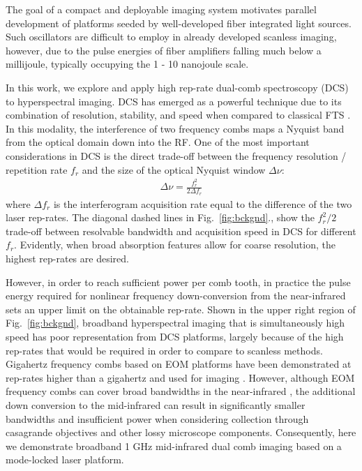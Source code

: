 \documentclass{optica-article}
\begin{document}
The goal of a compact and deployable imaging system motivates parallel development of platforms seeded by well-developed fiber integrated light sources. Such oscillators are difficult to employ in already developed scanless imaging, however, due to the pulse energies of fiber amplifiers falling much below a millijoule, typically occupying the 1 - 10 nanojoule scale. 

In this work, we explore and apply high rep-rate dual-comb spectroscopy (DCS) to hyperspectral imaging. DCS has emerged as a powerful technique due to its combination of resolution, stability, and speed when compared to classical FTS \cite{coddingtonDualcombSpectroscopy2016}. In this modality, the interference of two frequency combs maps a Nyquist band from the optical domain down into the RF. One of the most important considerations in DCS is the direct trade-off between the frequency resolution / repetition rate $f_r$ and the size of the optical Nyquist window $\Delta \nu$:
% 
\begin{align}
    \Delta \nu = \frac{f_r^2}{2 \Delta f_r}
    \label{eq:dcs}
\end{align}
% 
where $\Delta f_r$ is the interferogram acquisition rate equal to the difference of the two laser rep-rates. The diagonal dashed lines in \mbox{Fig. \ref{fig:bckgnd}}., show the $f_r^2/2$ trade-off between resolvable bandwidth and acquisition speed in DCS for different $f_r$. Evidently, when broad absorption features allow for coarse resolution, the highest rep-rates are desired. 

However, in order to reach sufficient power per comb tooth, in practice the pulse energy required for nonlinear frequency down-conversion from the near-infrared sets an upper limit on the obtainable rep-rate. Shown in the upper right region of \mbox{Fig. \ref{fig:bckgnd}}, broadband hyperspectral imaging that is simultaneously high speed has poor representation from DCS platforms, largely because of the high rep-rates that would be required in order to compare to scanless methods. Gigahertz frequency combs based on EOM platforms have been demonstrated at rep-rates higher than a gigahertz \cite{kowligyMidinfraredFrequencyCombs2020} and used for imaging \cite{ullahkhanDirectHyperspectralDualcomb2020,khanSubGHzOpticalResolution2023}. However, although EOM frequency combs can cover broad bandwidths in the near-infrared \cite{carlsonBroadbandElectroopticDualcomb2020}, the additional down conversion to the mid-infrared can result in significantly smaller bandwidths and insufficient power when considering collection through casagrande objectives and other lossy microscope components. Consequently, here we demonstrate broadband 1 GHz mid-infrared dual comb imaging based on a mode-locked laser platform.
\end{document}

